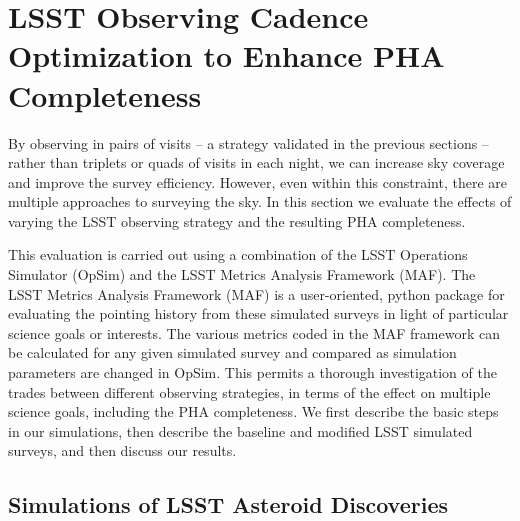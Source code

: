 \section{LSST Observing Cadence Optimization to Enhance PHA Completeness \label{sec:opsim}}

By observing in pairs of visits -- a strategy validated in the previous sections -- rather than triplets or quads of visits in each night, we can increase sky coverage and improve the survey efficiency. However, even within this constraint, there are multiple approaches to surveying the sky. In this section we evaluate the effects of varying the LSST observing strategy and the resulting PHA completeness.

This evaluation is carried out using a combination of the LSST Operations Simulator (OpSim) and the LSST Metrics
Analysis Framework (MAF).
The LSST Metrics Analysis Framework (MAF) is a user-oriented, python package for evaluating the pointing history
from these simulated surveys in light of particular science goals or interests. The various metrics coded in the
MAF framework can be calculated for any given simulated survey and compared as simulation parameters are changed
in OpSim. This permits a thorough investigation of the trades between different observing strategies, in terms of the
effect on multiple science goals, including the PHA completeness.  We first describe the basic steps in our simulations,
then describe the baseline and modified LSST simulated surveys, and then discuss our results.


\subsection{Simulations of LSST Asteroid Discoveries}

